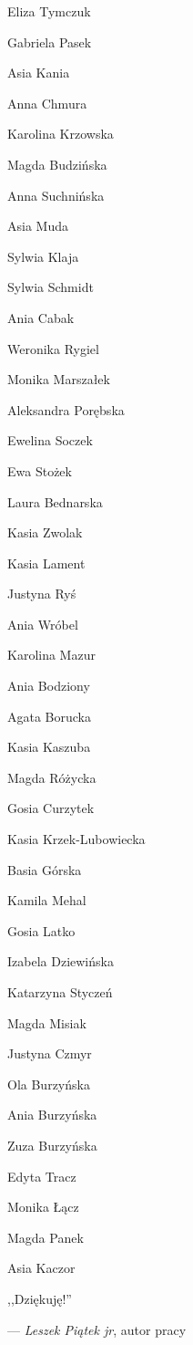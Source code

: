 \begin{packed_item}
    \item{Eliza Tymczuk}
    \item{Gabriela Pasek}
    \item{Asia Kania}
    \item{Anna Chmura}
    \item{Karolina Krzowska}
    \item{Magda Budzińska}
    \item{Anna Suchnińska}
    \item{Asia Muda}
    \item{Sylwia Klaja}
    \item{Sylwia Schmidt}
    \item{Ania Cabak}
    \item{Weronika Rygiel}
    \item{Monika Marszałek}
    \item{Aleksandra Porębska}
    \item{Ewelina Soczek}
    \item{Ewa Stożek}
    \item{Laura Bednarska}
    \item{Kasia Zwolak}
    \item{Kasia Lament}
    \item{Justyna Ryś}
    \item{Ania Wróbel}
    \item{Karolina Mazur}
    \item{Ania Bodziony}
    \item{Agata Borucka}
    \item{Kasia Kaszuba}
    \item{Magda Różycka}
    \item{Gosia Curzytek}
    \item{Kasia Krzek-Lubowiecka}
    \item{Basia Górska}
    \item{Kamila Mehal}
    \item{Gosia Latko}
    \item{Izabela Dziewińska}
    \item{Katarzyna Styczeń}
    \item{Magda Misiak}
    \item{Justyna Czmyr}
    \item{Ola Burzyńska}
    \item{Ania Burzyńska}
    \item{Zuza Burzyńska}
    \item{Edyta Tracz}
    \item{Monika Łącz}
    \item{Magda Panek}
    \item{Asia Kaczor}
\end{packed_item}

\begin{center}
    \Huge{,,Dziękuję!''}
\end{center}
\hfill\small{--- \textit{Leszek Piątek jr}, autor pracy}
